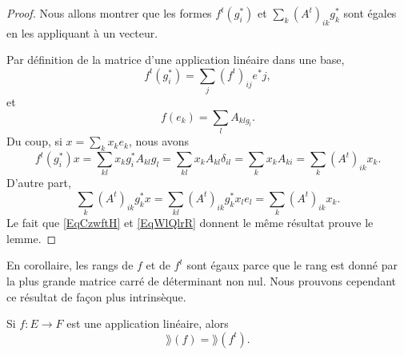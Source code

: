 \begin{proof}
    Nous allons montrer que les formes \( f^t(g^*_i)\) et \( \sum_k(A^t)_{ik}g^*_k\) sont égales en les appliquant à un vecteur.

    Par définition de la matrice d'une application linéaire dans une base,
    \begin{equation}
        f^t(g_i^*)=\sum_j(f^t)_{ij}e^*j,
    \end{equation}
    et
    \begin{equation}
        f(e_k)=\sum_lA_{klg_l}.
    \end{equation}
    Du coup, si \( x=\sum_kx_ke_k\), nous avons
    \begin{equation}    \label{EqCzwftH}
        f^t(g_i^*)x=\sum_{kl}x_kg_i^*A_{kl}g_l=\sum_{kl}x_kA_{kl}\delta_{il}=\sum_k x_kA_{ki}=\sum_k(A^t)_{ik}x_k.
    \end{equation}
    D'autre part, 
    \begin{equation}    \label{EqWlQlrR}
        \sum_k(A^t)_{ik}g_k^*x=\sum_{kl}(A^t)_{ik}g^*_kx_le_l=\sum_k(A^t)_{ik}x_k.
    \end{equation}
    Le fait que \eqref{EqCzwftH} et \eqref{EqWlQlrR} donnent le même résultat prouve le lemme.
\end{proof}
En corollaire, les rangs de \( f\) et de \( f^t\) sont égaux parce que le rang est donné par la plus grande matrice carré de déterminant non nul. Nous prouvons cependant ce résultat de façon plus intrinsèque.

\begin{lemma}   \label{LemSEpTcW}
    Si \( f\colon E\to F\) est une application linéaire, alors
    \begin{equation}
        \rang(f)=\rang(f^t).
    \end{equation}
\end{lemma}

